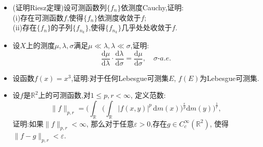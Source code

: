 \begin{itemize}
   
    \item[一、]
    (证明Riesz定理)设可测函数列$\{f_n\}$依测度Cauchy,证明:\\
    (i)存在可测函数$f$,使得$\{f_n\}$依测度收敛于$f$;\\
    (ii)存在$\{f_n\}$的子列$\{f_{n_k}\}$,使得$\{f_{n_k}\}$几乎处处收敛于$f$.
    
    \item[二、]
    设$X$上的测度$\mu,\lambda,\sigma$满足$\mu \ll \lambda, \lambda \ll \sigma$,证明:
    $$ \frac{\mathrm{d}\mu}{\mathrm{d}\lambda} \cdot \frac{\mathrm{d}\lambda}{\mathrm{d} \sigma} = \frac{\mathrm{d} \mu}{\mathrm{d} \sigma}, \quad\sigma \text{-} a.e.$$

    \item[三、]
    设函数$f(x)=x^3$,证明:对于任何Lebesgue可测集$E$, $f(E)$为Lebesgue可测集.
    
    \item[四、]
    设$f$是$\mathbb{R}^2$上的可测函数,对$1\leqslant p,r<\infty$, 定义范数:
    \[\| f\|_{p,r} = \bigg(\int_{\mathbb{R}}  \bigg(\int_{\mathbb{R}} |f(x,y)|^p \,\mathrm{d}m(x)\bigg)^\frac{r}{p}\mathrm{d}m(y)\bigg)^{\frac{1}{r}},\]
    证明:如果$\| f\|_{p,r} < \infty$, 
    那么对于任意$\varepsilon > 0$,存在$g \in C_c^{\infty}(\mathbb{R}^2)$, 
    使得$\| f-g\|_{p,r} < \varepsilon$.


\end{itemize}
